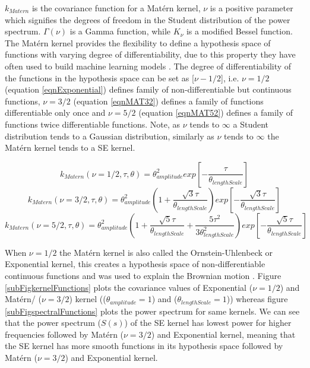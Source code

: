 $k_{Matern}$ is the covariance function for a Mat\'ern kernel, $\nu$ is a positive parameter which signifies the degrees of freedom in the Student distribution of the power spectrum. $\Gamma (\nu)$ is a Gamma function, while $K_{\nu}$ is a modified Bessel function. The Mat\'ern kernel provides the flexibility to define a hypothesis space of functions with varying degree of differentiability, due to this property they have often used to build machine learning models \cite{minasny2005matern, cornford2002modelling}. The degree of differentiability of the functions in the hypothesis space can be set as [$\nu-1/2$], i.e.  $\nu = 1/2$ (equation \ref{eqnExponential}) defines family of non-differentiable but continuous functions, $\nu = 3/2$ (equation \ref{eqnMAT32}) defines a family of functions differentiable only once and $\nu = 5/2$ (equation \ref{eqnMAT52}) defines a family of functions twice differentiable functions. Note, as $\nu$ tends to $\infty$ a Student distribution tends to a Gaussian distribution, similarly as $\nu$ tends to $\infty$ the Mat\'ern kernel tends to a SE kernel. 

\begin{equation}\label{eqnExponential}
k_{Matern}(\nu = 1/2, \tau, \theta) = \theta_{amplitude}^2exp[-\frac{\tau}{\theta_{lengthScale}}]
\end{equation}
\begin{equation}\label{eqnMAT32}
k_{Matern}(\nu = 3/2, \tau, \theta) = \theta_{amplitude}^2 (1 + \frac{\sqrt{3}\tau}{\theta_{lengthScale}}) exp[-\frac{\sqrt{3}\tau}{\theta_{lengthScale}}]
\end{equation}
\begin{equation}\label{eqnMAT52}
k_{Matern}(\nu = 5/2, \tau, \theta) = \theta_{amplitude}^2(1 + \frac{\sqrt{5}\tau}{\theta_{lengthScale}} + \frac{5\tau^2}{3\theta_{lengthScale}^2})
exp[-\frac{\sqrt{5}\tau}{\theta_{lengthScale}}]
\end{equation}

When $\nu = 1/2$ the Mat\'ern kernel is also called the Ornstein-Uhlenbeck or Exponential kernel, this creates a hypothesis space of non-differentiable continuous functions and was used to explain the Brownian motion \cite{uhlenbeck1930theory}. Figure \ref{subFigkernelFunctions} plots the covariance values of Exponential ($\nu=1/2$) and Mat\'ern/ ($\nu=3/2$) kernel (($\theta_{amplitude} = 1$) and ($\theta_{lengthScale} = 1$)) whereas figure \ref{subFigspectralFunctions} plots the power spectrum for same kernels. We can see that the power spectrum ($S(s)$) of the SE kernel has lowest power for higher frequencies followed by Mat\'ern ($\nu=3/2$) and Exponential kernel, meaning that the SE kernel has more smooth functions in its hypothesis space followed by Mat\'ern ($\nu=3/2$) and Exponential kernel. 

